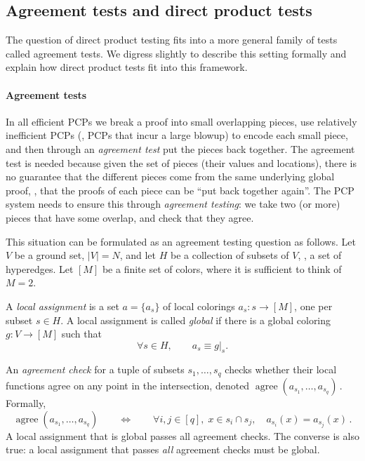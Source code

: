 \documentclass{toc}
\newcommand{\abs}[1]{\lvert#1\rvert} %
\newcommand{\set}[1]{\{#1\}} %
\DeclareMathOperator*{\agree}{agree} %
\begin{document}
\subsection{Agreement tests and direct product tests}

The question of direct product testing fits into a more general family of tests called agreement tests. We digress slightly to describe this setting formally and explain how direct product tests fit into this framework.

\paragraph*{Agreement tests}
In all efficient PCPs we break a proof into small overlapping pieces, use relatively inefficient PCPs (\ie, PCPs that incur a large blowup) to encode each small piece, and then through an \emph{agreement test} put the pieces back together. The agreement test is needed because given the 
%
set of pieces (their values and locations), %
%
%
there is no guarantee that the different pieces come from the same underlying global proof, \ie, that the proofs of each piece can be ``put back together again''. The PCP system needs to ensure this through \emph{agreement testing}: we take two (or more) pieces that have some overlap, and check that they agree.

This situation can be formulated as an agreement testing question as follows.
%
Let $V$ be a ground set, $\abs{V} = N$, and let $H$ be a collection of subsets of $V$, %
\ie,  %
a set of hyperedges. Let $[M]$ be a finite set of colors, where it is sufficient to think of $M=2$.

A \emph{local assignment} is a 
%
set %
$a=\set{a_s}$ of local colorings $a_s:s\to [M]$, one per subset $s\in H$. A local assignment is called \emph{global} if there is a global coloring $g:V\to[M]$ such that
\[ \forall s\in H, \qquad a_s \equiv g|_s.\]

An \emph{agreement check} for a tuple of subsets $s_1,\ldots,s_q$ checks whether their local functions agree on any point in the intersection, denoted $\agree(a_{s_1},\ldots, a_{s_q})$\,. Formally,
\[ \agree(a_{s_1},\ldots, a_{s_q})  \qquad \Leftrightarrow \qquad
\forall i,j\in [q],\; x\in s_i\cap s_j, \quad a_{s_i}(x) = a_{s_j}(x)\,.\] %
A local assignment that is global passes all agreement checks. The converse is also true: a local assignment that passes \emph{all} agreement checks must be global.
\end{document}

